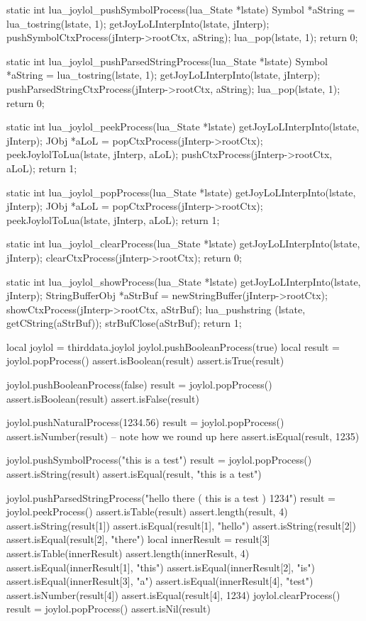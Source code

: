 static int lua_joylol_pushSymbolProcess(lua_State *lstate) {
  Symbol *aString = lua_tostring(lstate, 1);
  getJoyLoLInterpInto(lstate, jInterp);
  pushSymbolCtxProcess(jInterp->rootCtx, aString);
  lua_pop(lstate, 1);
  return 0;
}

static int lua_joylol_pushParsedStringProcess(lua_State *lstate) {
  Symbol *aString = lua_tostring(lstate, 1);
  getJoyLoLInterpInto(lstate, jInterp);
  pushParsedStringCtxProcess(jInterp->rootCtx, aString);
  lua_pop(lstate, 1);
  return 0;
}

static int lua_joylol_peekProcess(lua_State *lstate) {
  getJoyLoLInterpInto(lstate, jInterp);
  JObj *aLoL = popCtxProcess(jInterp->rootCtx);
  peekJoylolToLua(lstate, jInterp, aLoL);
  pushCtxProcess(jInterp->rootCtx, aLoL);
  return 1;
}

static int lua_joylol_popProcess(lua_State *lstate) {
  getJoyLoLInterpInto(lstate, jInterp);
  JObj *aLoL = popCtxProcess(jInterp->rootCtx);
  peekJoylolToLua(lstate, jInterp, aLoL);
  return 1;
}

static int lua_joylol_clearProcess(lua_State *lstate) {
  getJoyLoLInterpInto(lstate, jInterp);
  clearCtxProcess(jInterp->rootCtx);
  return 0;
}

static int lua_joylol_showProcess(lua_State *lstate) {
  getJoyLoLInterpInto(lstate, jInterp);
  StringBufferObj *aStrBuf = newStringBuffer(jInterp->rootCtx);
  showCtxProcess(jInterp->rootCtx, aStrBuf);
  lua_pushstring (lstate, getCString(aStrBuf));
  strBufClose(aStrBuf);
  return 1;
}
\stopCCode

\startLuaTest
  local joylol = thirddata.joylol
  joylol.pushBooleanProcess(true)
  local result = joylol.popProcess()
  assert.isBoolean(result)
  assert.isTrue(result)
  
  joylol.pushBooleanProcess(false)
  result = joylol.popProcess()
  assert.isBoolean(result)
  assert.isFalse(result)
  
  joylol.pushNaturalProcess(1234.56)
  result = joylol.popProcess()
  assert.isNumber(result)
  -- note how we round up here
  assert.isEqual(result, 1235)
  
  joylol.pushSymbolProcess("this is a test")
  result = joylol.popProcess()
  assert.isString(result)
  assert.isEqual(result, "this is a test")

  joylol.pushParsedStringProcess("hello there ( this is a test ) 1234")
  result = joylol.peekProcess()
  assert.isTable(result)
  assert.length(result, 4)
  assert.isString(result[1])
  assert.isEqual(result[1], "hello")
  assert.isString(result[2])
  assert.isEqual(result[2], "there")
  local innerResult = result[3]
  assert.isTable(innerResult)
  assert.length(innerResult, 4)
  assert.isEqual(innerResult[1], "this")
  assert.isEqual(innerResult[2], "is")
  assert.isEqual(innerResult[3], "a")
  assert.isEqual(innerResult[4], "test")
  assert.isNumber(result[4])
  assert.isEqual(result[4], 1234)
  joylol.clearProcess()
  result = joylol.popProcess()
  assert.isNil(result)
\stopLuaTest
\stopTestCase
\stopTestSuite

